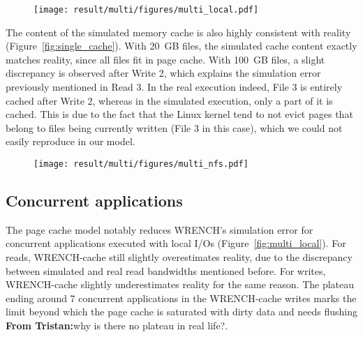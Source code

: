 \documentclass[conference]{IEEEtran}
\newcommand{\tristan}[1]{\color{orange}\textbf{From Tristan:}#1\color{black}}
\newcommand{\wrench}{WRENCH\xspace}
\begin{document}
        \begin{figure*}
            \begin{subfigure}{\linewidth}
                \centering
                \texttt{[image: result/multi/figures/multi\_local.pdf]}
            \end{subfigure}
            \caption{Concurrent results with 3~GB files (averages on 5 repetitions)}
            \label{fig:multi_local}
        \end{figure*}


        The content of the simulated memory cache is also highly consistent
        with reality (Figure~\ref{fig:single_cache}). With 20~GB files, the
        simulated cache content exactly matches reality, since all files fit in page cache. With 100~GB files, a slight
        discrepancy is observed after Write 2, which explains the
        simulation error previously mentioned in Read 3. In the real execution indeed,
        File 3 is entirely cached after Write 2, whereas in the simulated execution, 
        only a part of it is cached. 
        This is due to the fact that the Linux kernel tend to not evict 
        pages that belong to files being currently written (File 3 in this case), which we 
        could not easily reproduce in our model.
        \begin{figure*}
            \begin{subfigure}{\linewidth}
                \centering
                \texttt{[image: result/multi/figures/multi\_nfs.pdf]}
            \end{subfigure}
            \caption{NFS results with 3~GB files (averages on 5 repetitions)}
            \label{fig:multi_nfs}
            \end{figure*}

        \subsection{Concurrent applications}



            The page cache model notably reduces \wrench's simulation error
            for concurrent applications executed with local I/Os
            (Figure~\ref{fig:multi_local}). For reads, \wrench-cache still
            slightly overestimates reality, due to the discrepancy between
            simulated and real read bandwidths mentioned before. For writes,
            \wrench-cache slightly underestimates reality for the same reason. The plateau
            ending around 7 concurrent applications in the \wrench-cache writes
            marks the limit beyond which the page cache is saturated with dirty data
            and needs flushing \tristan{why is there no plateau in real life?}.
\end{document}
